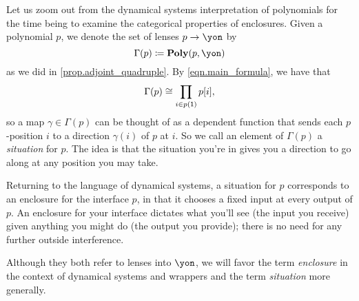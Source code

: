 \documentclass[Book-Poly]{subfiles}
\begin{document}
Let us zoom out from the dynamical systems interpretation of polynomials for the time being to examine the categorical properties of enclosures.
Given a polynomial $p$, we denote the set of lenses $p\to\yon$ by
\begin{equation} \label{eqn.gamma_def}
\Gamma(p)\coloneqq\poly(p,\yon)
\end{equation}
as we did in \cref{prop.adjoint_quadruple}.
By \eqref{eqn.main_formula}, we have that
\begin{equation} \label{eqn.gamma_prod}
    \Gamma(p) \cong \prod_{i \in p(\textsf{1})} p[i],
\end{equation}
so a map $\gamma\in\Gamma(p)$ can be thought of as a dependent function that sends each $p$-position $i$ to a direction $\gamma(i)$ of $p$ at $i$.
So we call an element of $\Gamma(p)$ a \emph{situation} for $p$.
The idea is that the situation you're in gives you a direction to go along at any position you may take.

Returning to the language of dynamical systems, a situation for $p$ corresponds to an enclosure for the interface $p$, in that it chooses a fixed input at every output of $p$.
An enclosure for your interface dictates what you'll see (the input you receive) given anything you might do (the output you provide); there is no need for any further outside interference.

\begin{remark}
Although they both refer to lenses into $\yon$, we will favor the term \emph{enclosure} in the context of dynamical systems and wrappers and the term \emph{situation} more generally.
\end{remark}
\end{document}
